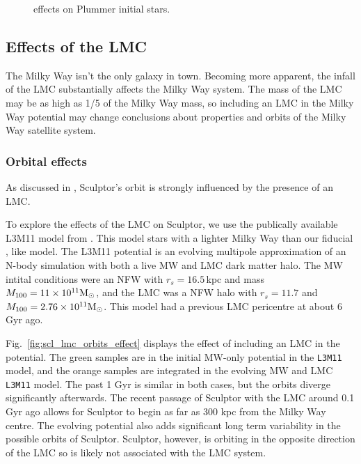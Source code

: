 \begin{figure}
\centering
{}
\caption[Sculptor Plummer initial and final density profiles]{effects on
Plummer initial stars.}\label{fig:scl_smallperi_plummer_i_f}
\end{figure}

\subsection{Effects of the LMC}\label{sec:scl_lmc}

The Milky Way isn't the only galaxy in town. Becoming more apparent, the
infall of the LMC substantially affects the Milky Way system. The mass
of the LMC may be as high as 1/5 of the Milky Way mass, so including an
LMC in the Milky Way potential may change conclusions about properties
and orbits of the Milky Way satellite system.

\subsubsection{Orbital effects}\label{orbital-effects}

As discussed in \citet{battaglia+2022}, Sculptor's orbit is strongly
influenced by the presence of an LMC.

To explore the effects of the LMC on Sculptor, we use the publically
available L3M11 model from \citet{vasiliev2024}. This model stars with a
lighter Milky Way than our fiducial \citet{EP2020}, \citet{mcmillan2011}
like model. The L3M11 potential is an evolving multipole approximation
of an N-body simulation with both a live MW and LMC dark matter halo.
The MW intital conditions were an NFW with \(r_s=16.5\,\)kpc and mass
\(M_{\rm 100}= 11\times10^{11}{\rm M}_{\odot}\), and the LMC was a NFW halo with
\(r_s=11.7\) and \(M_{100} = 2.76 \times 10^{11} {\rm M}_{\odot}\). This model had a
previous LMC pericentre at about 6 Gyr ago.

Fig.~\ref{fig:scl_lmc_orbits_effect} displays the effect of including an
LMC in the potential. The green samples are in the initial MW-only
potential in the \texttt{L3M11} model, and the orange samples are
integrated in the evolving MW and LMC \texttt{L3M11} model. The past 1
Gyr is similar in both cases, but the orbits diverge significantly
afterwards. The recent passage of Sculptor with the LMC around 0.1 Gyr
ago allows for Sculptor to begin as far as 300 kpc from the Milky Way
centre. The evolving potential also adds significant long term
variability in the possible orbits of Sculptor. Sculptor, however, is
orbiting in the opposite direction of the LMC so is likely not
associated with the LMC system.

